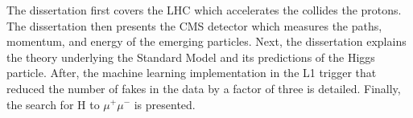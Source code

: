 The dissertation first covers the LHC which accelerates the collides the protons. The dissertation then presents the CMS detector which measures the paths, momentum, and energy of the emerging particles. Next, the dissertation explains the theory underlying the Standard Model and its predictions of the Higgs particle. After, the machine learning implementation in the L1 trigger that reduced the number of fakes in the data by a factor of three is detailed. Finally, the search for H to $\mu^{+}\mu^{-}$ is presented.
